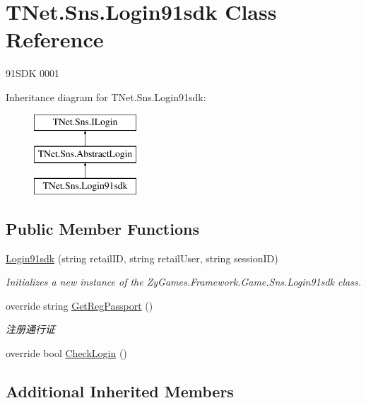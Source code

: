 \hypertarget{class_t_net_1_1_sns_1_1_login91sdk}{}\section{T\+Net.\+Sns.\+Login91sdk Class Reference}
\label{class_t_net_1_1_sns_1_1_login91sdk}


91\+S\+DK 0001  


Inheritance diagram for T\+Net.\+Sns.\+Login91sdk\+:\begin{figure}[H]
\begin{center}
\leavevmode
\includegraphics[height=3.000000cm]{class_t_net_1_1_sns_1_1_login91sdk}
\end{center}
\end{figure}
\subsection*{Public Member Functions}
\begin{DoxyCompactItemize}
\item 
\mbox{\hyperlink{class_t_net_1_1_sns_1_1_login91sdk_af975e6b6b17ee3680a3856d6c270c780}{Login91sdk}} (string retail\+ID, string retail\+User, string session\+ID)
\begin{DoxyCompactList}\small\item\em Initializes a new instance of the Zy\+Games.\+Framework.\+Game.\+Sns.\+Login91sdk class. \end{DoxyCompactList}\item 
override string \mbox{\hyperlink{class_t_net_1_1_sns_1_1_login91sdk_a036829f25d9543f335e23a33bcf229b6}{Get\+Reg\+Passport}} ()
\begin{DoxyCompactList}\small\item\em 注册通行证 \end{DoxyCompactList}\item 
override bool \mbox{\hyperlink{class_t_net_1_1_sns_1_1_login91sdk_a7fb59241eea5837cf4dc7c0698502d98}{Check\+Login}} ()
\end{DoxyCompactItemize}
\subsection*{Additional Inherited Members}



